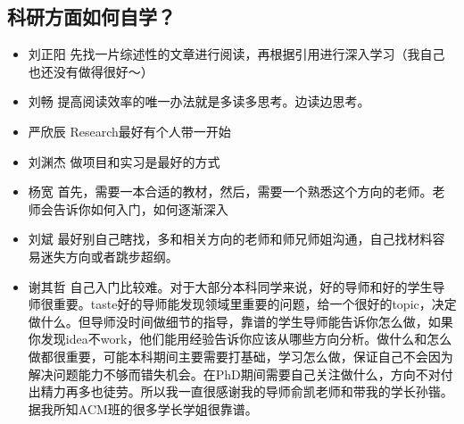 \documentclass{vivid_layout}
\begin{document}
\subsection{科研方面如何自学？}
\begin{itemize}
\item { 刘正阳}  \quad  先找一片综述性的文章进行阅读，再根据引用进行深入学习（我自己也还没有做得很好～）
\item  { 刘畅}  \quad 提高阅读效率的唯一办法就是多读多思考。边读边思考。
\item  { 严欣辰}  \quad Research最好有个人带一开始
\item  { 刘渊杰}  \quad 做项目和实习是最好的方式
\item  { 杨宽}  \quad 首先，需要一本合适的教材，然后，需要一个熟悉这个方向的老师。老师会告诉你如何入门，如何逐渐深入
\item  { 刘斌}  \quad 最好别自己瞎找，多和相关方向的老师和师兄师姐沟通，自己找材料容易迷失方向或者跳步超纲。
\item  { 谢其哲}  \quad 自己入门比较难。对于大部分本科同学来说，好的导师和好的学生导师很重要。taste好的导师能发现领域里重要的问题，给一个很好的topic，决定做什么。但导师没时间做细节的指导，靠谱的学生导师能告诉你怎么做，如果你发现idea不work，他们能用经验告诉你应该从哪些方向分析。做什么和怎么做都很重要，可能本科期间主要需要打基础，学习怎么做，保证自己不会因为解决问题能力不够而错失机会。在PhD期间需要自己关注做什么，方向不对付出精力再多也徒劳。所以我一直很感谢我的导师俞凯老师和带我的学长孙锴。据我所知ACM班的很多学长学姐很靠谱。
\end{itemize}
\end{document}
